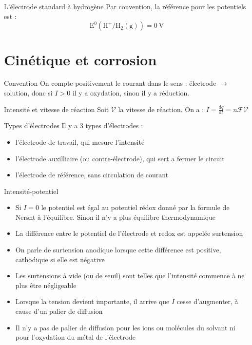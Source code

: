 \documentclass[french, a4paper, 11pt, twocolumn]{article}
\begin{document}
    \begin{cadre}{L'électrode standard à hydrogène}
        Par convention, la référence pour les potentiels est :
        \[\mathrm{E^0(H^+/H_2(g))=\SI{0}{\volt}}\]
    \end{cadre}

    \section{Cinétique et corrosion}
    \begin{cadre}{Convention}
        On compte positivement le courant dans le sens : électrode \(\rightarrow\) solution, donc si \(I>0\) il y a oxydation,
        sinon il y a réduction.
    \end{cadre}

    \begin{cadre}{Intensité et vitesse de réaction}
        Soit \(\mathscr{V}\) la vitesse de réaction.
        On a : \(I=\frac{\mathrm{d}q}{\mathrm{d}t}=n\mathcal{F}\mathscr{V}\)
    \end{cadre}

    \begin{cadre}{Types d'électrodes}
        Il y a 3 types d'électrodes :
        \begin{itemize}
            \item l'électrode de travail, qui mesure l'intensité
            \item l'électrode auxilliaire (ou contre-électrode), qui sert a fermer le circuit
            \item l'électrode de référence, sans circulation de courant
        \end{itemize}
    \end{cadre}

    \begin{cadre}{Intensité-potentiel}
        \begin{itemize}[label=\(\bullet\)]
            \item Si \(I=0\) le potentiel est égal au potentiel rédox donné par la formule de Nersnt à l'équilibre. Sinon il n'y a plus équilibre thermodynamique
            
            \item La différence entre le potentiel de l'électrode et redox est appelée surtension
            \item On parle de surtension anodique lorsque cette différence est positive, cathodique si elle est négative
            \item Les surtensions à vide (ou de seuil) sont telles que l'intensité commence à ne plus être négligeable
            
            \item Lorsque la tension devient importante, il arrive que \(I\) cesse d'augmenter, à cause d'un palier de diffusion
            \item Il n'y a pas de palier de diffusion pour les ions ou molécules du solvant ni pour l'oxydation du métal de l'électrode
        \end{itemize}
    \end{cadre}
\end{document}
